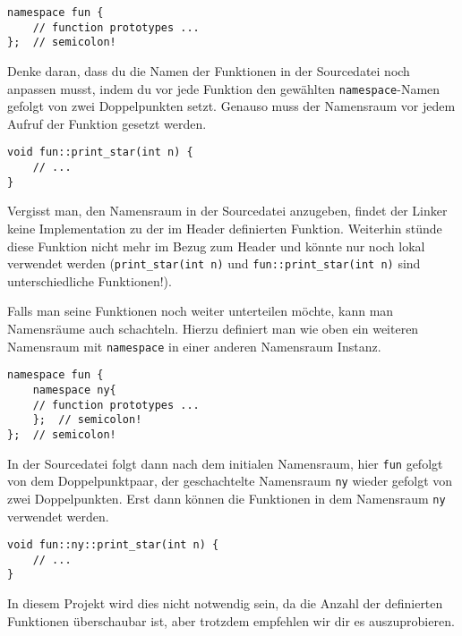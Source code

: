 \begin{lstlisting}
namespace fun {
    // function prototypes ...
};  // semicolon!
\end{lstlisting}

Denke daran, dass du die Namen der Funktionen in der Sourcedatei noch anpassen musst, indem du vor jede Funktion den gewählten \lstinline{namespace}-Namen gefolgt von zwei Doppelpunkten setzt.
Genauso muss der Namensraum vor jedem Aufruf der Funktion gesetzt werden.

\begin{lstlisting}
void fun::print_star(int n) {
    // ...
}
\end{lstlisting}

Vergisst man, den Namensraum in der Sourcedatei anzugeben, findet der Linker keine Implementation zu der im Header definierten Funktion.
Weiterhin stünde diese Funktion nicht mehr im Bezug zum Header und könnte nur noch lokal verwendet werden (\lstinline{print_star(int n)} und \lstinline{fun::print_star(int n)} sind unterschiedliche Funktionen!). \\ \smallskip

Falls man seine Funktionen noch weiter unterteilen möchte, kann man Namensräume auch schachteln.
Hierzu definiert man wie oben ein weiteren Namensraum mit \lstinline{namespace} in einer anderen Namensraum Instanz.

\begin{lstlisting}
namespace fun {
    namespace ny{
    // function prototypes ...
    };  // semicolon!
};  // semicolon!
\end{lstlisting}

In der Sourcedatei folgt dann nach dem initialen Namensraum, hier \lstinline{fun} gefolgt von dem Doppelpunktpaar, der geschachtelte Namensraum \lstinline{ny} wieder gefolgt von zwei Doppelpunkten.
Erst dann können die Funktionen in dem Namensraum \lstinline{ny} verwendet werden.

\begin{lstlisting}
void fun::ny::print_star(int n) {
    // ...
}
\end{lstlisting}

In diesem Projekt wird dies nicht notwendig sein, da die Anzahl der definierten Funktionen überschaubar ist, aber trotzdem empfehlen wir dir es auszuprobieren.


